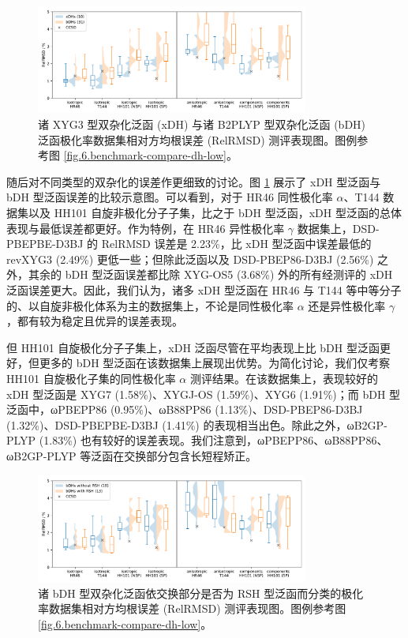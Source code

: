 \begin{figure}[hp]
    \centering
    \includegraphics[width=0.8\textwidth]{assets/benchmark-compare-xdh-bdh.pdf}
    \caption{诸 XYG3 型双杂化泛函 (xDH) 与诸 B2PLYP 型双杂化泛函 (bDH) 泛函极化率数据集相对方均根误差 (RelRMSD) 测评表现图。图例参考图 \ref{fig.6.benchmark-compare-dh-low}。}
    \label{fig.6.benchmark-compare-xdh-bdh}
\end{figure}

随后对不同类型的双杂化的误差作更细致的讨论。图 \ref{fig.6.benchmark-compare-xdh-bdh} 展示了 xDH 型泛函与 bDH 型泛函误差的比较示意图。可以看到，对于 HR46 同性极化率 $\alpha$、T144 数据集以及 HH101 自旋非极化分子子集，比之于 bDH 型泛函，xDH 型泛函的总体表现与最低误差都更好。作为特例，在 HR46 异性极化率 $\gamma$ 数据集上，DSD-PBEPBE-D3BJ 的 RelRMSD 误差是 2.23\%，比 xDH 型泛函中误差最低的 revXYG3 (2.49\%) 更低一些；但除此泛函以及 DSD-PBEP86-D3BJ (2.56\%) 之外，其余的 bDH 型泛函误差都比除 XYG-OS5 (3.68\%) 外的所有经测评的 xDH 泛函误差更大。因此，我们认为，诸多 xDH 型泛函在 HR46 与 T144 等中等分子的、以自旋非极化体系为主的数据集上，不论是同性极化率 $\alpha$ 还是异性极化率 $\gamma$，都有较为稳定且优异的误差表现。

但 HH101 自旋极化分子子集上，xDH 泛函尽管在平均表现上比 bDH 型泛函更好，但更多的 bDH 型泛函在该数据集上展现出优势。为简化讨论，我们仅考察 HH101 自旋极化子集的同性极化率 $\alpha$ 测评结果。在该数据集上，表现较好的 xDH 型泛函是 XYG7 (1.58\%)、XYGJ-OS (1.59\%)、XYG6 (1.91\%)；而 bDH 型泛函中，ωPBEPP86 (0.95\%)、ωB88PP86 (1.13\%)、DSD-PBEP86-D3BJ (1.32\%)、DSD-PBEPBE-D3BJ (1.41\%) 的表现相当出色。除此之外，ωB2GP-PLYP (1.83\%) 也有较好的误差表现。我们注意到，ωPBEPP86、ωB88PP86、ωB2GP-PLYP 等泛函在交换部分包含长短程矫正。

\begin{figure}[hp]
    \centering
    \includegraphics[width=0.8\textwidth]{assets/benchmark-compare-dh-rsh.pdf}
    \caption{诸 bDH 型双杂化泛函依交换部分是否为 RSH 型泛函而分类的极化率数据集相对方均根误差 (RelRMSD) 测评表现图。图例参考图 \ref{fig.6.benchmark-compare-dh-low}。}
    \label{fig.6.benchmark-compare-dh-rsh}
\end{figure}

